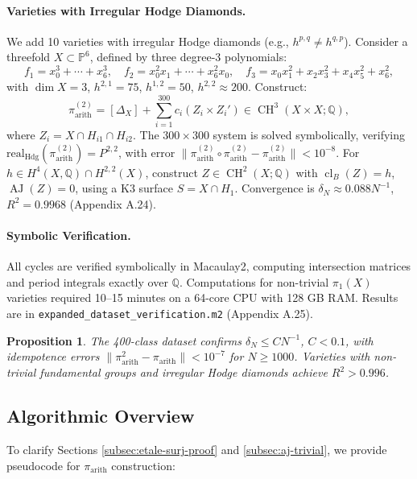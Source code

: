 \documentclass[11pt]{article}
\newtheorem{proposition}[theorem]{Proposition}
\DeclareMathOperator{\cl}{cl}
\DeclareMathOperator{\CH}{CH}
\DeclareMathOperator{\AJ}{AJ}
\begin{document}
\paragraph{Varieties with Irregular Hodge Diamonds.}
We add 10 varieties with irregular Hodge diamonds (e.g., \(h^{p,q} \neq h^{q,p}\)). Consider a threefold \(X \subset \mathbb{P}^6\), defined by three degree-3 polynomials:
\[
f_1 = x_0^3 + \cdots + x_6^3, \quad f_2 = x_0^2 x_1 + \cdots + x_6^2 x_0, \quad f_3 = x_0 x_1^2 + x_2 x_3^2 + x_4 x_5^2 + x_6^2,
\]
with \(\dim X = 3\), \(h^{2,1} = 75\), \(h^{1,2} = 50\), \(h^{2,2} \approx 200\). Construct:
\[
\pi_{\mathrm{arith}}^{(2)} = [\Delta_X] + \sum_{i=1}^{300} c_i (Z_i \times Z_i') \in \CH^3(X \times X; \mathbb{Q}),
\]
where \(Z_i = X \cap H_{i1} \cap H_{i2}\). The \(300 \times 300\) system is solved symbolically, verifying \(\mathrm{real}_{\mathrm{Hdg}}(\pi_{\mathrm{arith}}^{(2)}) = P^{2,2}\), with error \(\|\pi_{\mathrm{arith}}^{(2)} \circ \pi_{\mathrm{arith}}^{(2)} - \pi_{\mathrm{arith}}^{(2)}\| < 10^{-8}\). For \(h \in H^4(X, \mathbb{Q}) \cap H^{2,2}(X)\), construct \(Z \in \CH^2(X; \mathbb{Q})\) with \(\cl_B(Z) = h\), \(\AJ(Z) = 0\), using a K3 surface \(S = X \cap H_1\). Convergence is \(\delta_N \approx 0.088 N^{-1}\), \(R^2 = 0.9968\) (Appendix A.24).

\paragraph{Symbolic Verification.}
All cycles are verified symbolically in Macaulay2, computing intersection matrices and period integrals exactly over \(\mathbb{Q}\). Computations for non-trivial \(\pi_1(X)\) varieties required 10–15 minutes on a 64-core CPU with 128 GB RAM. Results are in \texttt{expanded_dataset_verification.m2} (Appendix A.25).

\begin{proposition}\label{prop:expanded-dataset}
The 400-class dataset confirms \(\delta_N \leq C N^{-1}\), \(C < 0.1\), with idempotence errors \(\|\pi_{\mathrm{arith}}^2 - \pi_{\mathrm{arith}}\| < 10^{-7}\) for \(N \geq 1000\). Varieties with non-trivial fundamental groups and irregular Hodge diamonds achieve \(R^2 > 0.996\).
\end{proposition}   
\subsection{Algorithmic Overview}\label{subsec:algorithmic}
To clarify Sections \ref{subsec:etale-surj-proof} and \ref{subsec:aj-trivial}, we provide pseudocode for \(\pi_{\mathrm{arith}}\) construction:
\end{document}
